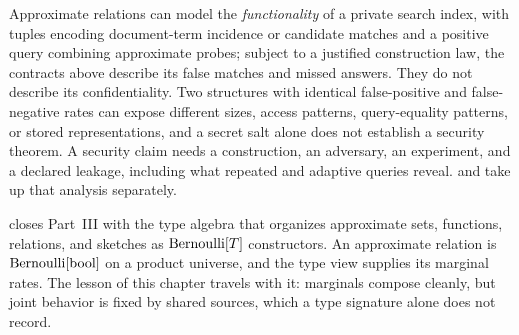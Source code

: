 \begin{remark}
\label{rem:ch12-encrypted-scope}
Approximate relations can model the \emph{functionality} of a private search
index, with tuples encoding document-term incidence or candidate matches and a
positive query combining approximate probes; subject to a justified construction
law, the contracts above describe its false matches and missed answers. They do not
describe its confidentiality. Two structures with identical false-positive and
false-negative rates can expose different sizes, access patterns, query-equality
patterns, or stored representations, and a secret salt alone does not establish a
security theorem. A security claim needs a construction, an adversary, an
experiment, and a declared leakage, including what repeated and adaptive queries
reveal.  and  take up
that analysis separately.
\end{remark}

 closes Part~III with the type algebra that organizes
approximate sets, functions, relations, and sketches as $\mathrm{Bernoulli}[T]$
constructors. An approximate relation is $\mathrm{Bernoulli}[\mathrm{bool}]$ on a product
universe, and the type view supplies its marginal rates. The lesson of this chapter
travels with it: marginals compose cleanly, but joint behavior is fixed by shared
sources, which a type signature alone does not record.
